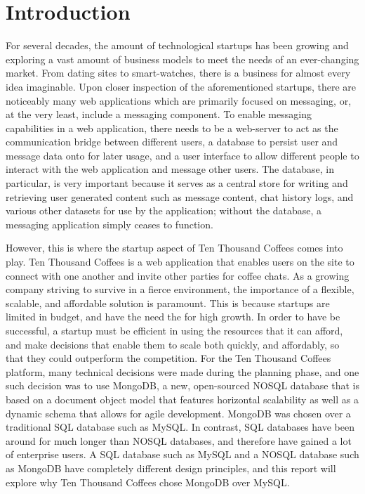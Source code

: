 \documentclass[12pt]{article}
\begin{document}
\newpage


\toc


\section{Introduction}
For several decades, the amount of technological startups has been growing and exploring a vast amount of business models to meet the needs of an ever-changing market. From dating sites to smart-watches, there is a business for almost every idea imaginable. Upon closer inspection of the aforementioned startups, there are noticeably many web applications which are primarily focused on messaging, or, at the very least, include a messaging component. To enable messaging capabilities in a web application, there needs to be a web-server to act as the communication bridge between different users, a database to persist user and message data onto for later usage, and a user interface to allow different people to interact with the web application and message other users. The database, in particular, is very important because it serves as a central store for writing and retrieving user generated content such as message content, chat history logs, and various other datasets for use by the application; without the database, a messaging application simply ceases to function.

However, this is where the startup aspect of Ten Thousand Coffees comes into play. Ten Thousand Coffees is a web application that enables users on the site to connect with one another and invite other parties for coffee chats. As a growing company striving to survive in a fierce environment, the importance of a flexible, scalable, and affordable solution is paramount. This is because startups are limited in budget, and have the need the for high growth. In order to have be successful, a startup must be efficient in using the resources that it can afford, and make decisions that enable them to scale both quickly, and affordably, so that they could outperform the competition. For the Ten Thousand Coffees platform, many technical decisions were made during the planning phase, and one such decision was to use MongoDB, a new, open-sourced NOSQL database that is based on a document object model that features horizontal scalability as well as a dynamic schema that allows for agile development. MongoDB was chosen over a traditional SQL database such as MySQL. In contrast, SQL databases have been around for much longer than NOSQL databases, and therefore have gained a lot of enterprise users. A SQL database such as MySQL and a NOSQL database such as MongoDB have completely different design principles, and this report will explore why Ten Thousand Coffees chose MongoDB over MySQL.
\end{document}
